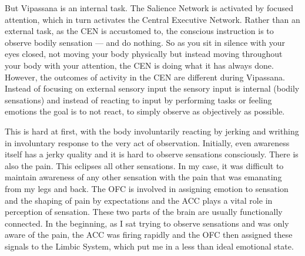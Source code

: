 \documentclass[a4paper, amsfonts, amssymb, amsmath, reprint, showkeys, nofootinbib, twoside]{revtex4-1}
\begin{document}
But Vipassana is an internal task. The Salience Network is activated by focused
attention, which in turn activates the Central Executive Network. Rather than an
external task, as the CEN is accustomed to, the conscious instruction is to observe
bodily sensation --- and do nothing. So as you sit in silence with your eyes closed,
not moving your body physically but instead moving throughout your body with your
attention, the CEN is doing what it has always done. However, the outcomes of
activity in the CEN are different during Vipassana. Instead of focusing on
external sensory input the sensory input is internal (bodily sensations) and instead
of reacting to input by performing tasks or feeling emotions the goal is to not
react, to simply observe as objectively as possible.

This is hard at first, with the body involuntarily reacting by jerking and writhing
in involuntary response to the very act of observation. Initially, even awareness
itself has a jerky quality and it is hard to observe sensations consciously. There is also the
pain. This eclipses all other sensations. In my case, it was difficult to maintain
awareness of any other sensation with the pain that was emanating from my legs and
back. The OFC is involved in assigning emotion to sensation and the shaping of pain by expectations
\cite{ofcemotion,ofcexpect} and the ACC plays a vital role in perception of sensation.
These two parts of the brain are usually functionally connected.
In the beginning, as I sat trying to observe sensations and was only aware of the pain,
the ACC was firing rapidly and the OFC then assigned these signals to the Limbic System, which
put me in a less than ideal emotional state.
\end{document}
